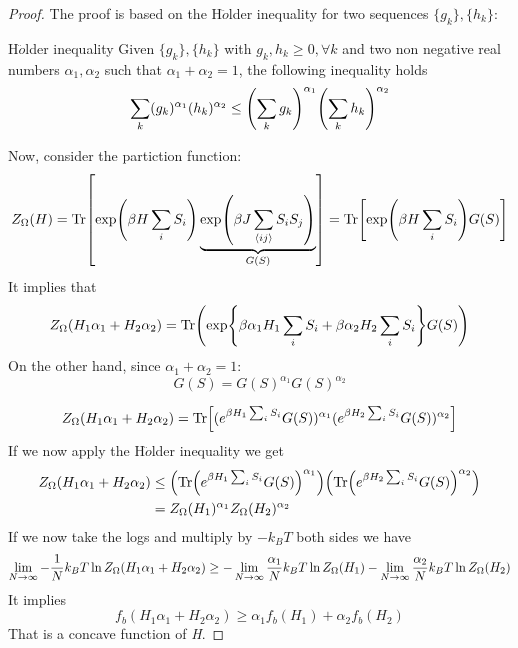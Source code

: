 \documentclass[../main/main.tex]{subfiles}
\begin{document}
\begin{proof}
The proof is based on the H$\ddot{o}$lder inequality for two sequences  \( \{ g_k \}, \{ h_k \}     \):

  \begin{definition}{H$\ddot{o}$lder inequality}{}
    Given  \( \{ g_k \}, \{ h_k \}     \) with \( g_k,h_k \ge 0, \forall k \) and two non negative real numbers \( \alpha _1, \alpha _2 \) such that \( \alpha _1 + \alpha _2 =1 \), the following inequality holds
    \begin{equation}
      \sum_{k}^{} (g_k)^{\alpha _1} (h_k)^{\alpha _2} \le \qty(\sum_{k}^{} g_k )^{\alpha _1} \qty(\sum_{k}^{} h_k )^{\alpha _2}
    \end{equation}
  \end{definition}

Now, consider the partiction function:
\begin{equation}
  Z_ \Omega  (H) = \Tr[\exp (\beta H \sum_{i}^{} S_i ) \underbrace{\exp (\beta J \sum_{\expval{ij} }^{} S_i S_j ) }_{G (S)}  ] = \Tr [\exp (\beta H \sum_{i}^{} S_i ) G (S)]
\end{equation}
It implies that
\begin{equation}
  Z_ \Omega  (H_1 \alpha _1 + H_2 \alpha _2) = \Tr(\exp {\beta \alpha _1 H_1 \sum_{i}^{} S_i + \beta \alpha _2 H_2 \sum_{i}^{} S_i} G(S))
\end{equation}
On the other hand, since \( \alpha _1 + \alpha _2 =1 \):
\begin{equation}
  G (S) = G (S)^{\alpha _1} G(S)^{\alpha _2}
\end{equation}

\begin{equation}
    Z_ \Omega  (H_1 \alpha _1 + H_2 \alpha _2)   = \Tr[ (e^{\beta H_1 \sum_{i}^{} S_i } G (S))^{\alpha _1} (e^{\beta H_2 \sum_{i}^{} S_i } G (S))^{\alpha _2}]
\end{equation}
If we now apply the H$\ddot{o}$lder inequality we get
\begin{equation}
\begin{split}
    Z_ \Omega  (H_1 \alpha _1 + H_2 \alpha _2) & \le \qty(\Tr (e^{\beta H_1 \sum_{i}^{} S_i } G(S))^{\alpha _1}  ) \qty(\Tr (e^{\beta H_2 \sum_{i}^{} S_i } G (S))^{\alpha _2}  ) \\
    & = Z_ \Omega (H_1)^{\alpha _1} Z_ \Omega (H_2)^{\alpha _2}
\end{split}
\end{equation}
If we now take the logs and multiply by \( -k_B T \) both sides we have
\begin{equation}
  \lim_{N \rightarrow \infty } - \frac{1}{N} k_B T \ln{Z_ \Omega (H_1 \alpha _1 + H_2 \alpha _2)}  \ge
   - \lim_{N \rightarrow \infty } \frac{\alpha _1}{N} k_B T \ln{Z_ \Omega  (H_1 )} -
    \lim_{N \rightarrow \infty } \frac{\alpha _2}{N} k_B T \ln{Z_ \Omega  (H_2 )}  \\
\end{equation}
It implies
\begin{equation}
  f_b (H_1 \alpha _1 + H_2 \alpha _2) \ge \alpha _1 f_b (H_1 ) +  \alpha _2 f_b (H_2)
\end{equation}
That is a concave function of \emph{H}.
\end{proof}
\end{document}
